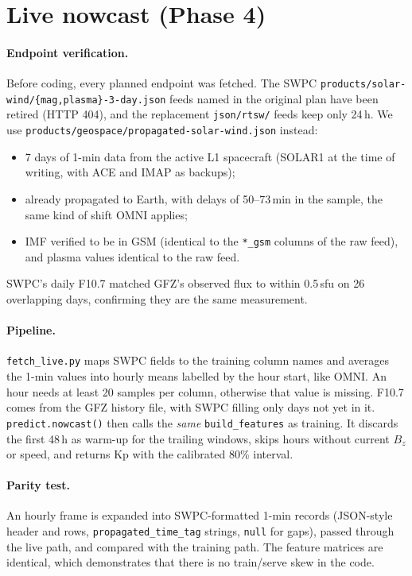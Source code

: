 \documentclass[11pt,a4paper]{article}
\newcommand{\code}[1]{\texttt{#1}}
\begin{document}
\section{Live nowcast (Phase 4)}\label{sec:live}
\paragraph{Endpoint verification.} Before coding, every planned endpoint was fetched. The SWPC
\code{products/solar-wind/\{mag,plasma\}-3-day.json} feeds named in the original plan have been retired (HTTP
404), and the replacement \code{json/rtsw/} feeds keep only 24\,h. We use
\code{products/geospace/propagated-solar-wind.json} instead:
\begin{itemize}
\item 7 days of 1-min data from the active L1 spacecraft (SOLAR1 at the time of writing, with ACE and IMAP as
backups);
\item already propagated to Earth, with delays of 50--73\,min in the sample, the same kind of shift OMNI applies;
\item IMF verified to be in GSM (identical to the \code{*\_gsm} columns of the raw feed), and plasma values
identical to the raw feed.
\end{itemize}
SWPC's daily F10.7 matched GFZ's observed flux to within 0.5\,sfu on 26 overlapping days, confirming they are the
same measurement.

\paragraph{Pipeline.} \code{fetch\_live.py} maps SWPC fields to the training column names and averages the
1-min values into hourly means labelled by the hour start, like OMNI. An hour needs at least 20 samples per
column, otherwise that value is missing. F10.7 comes from the GFZ history file, with SWPC filling only days not yet
in it. \code{predict.nowcast()} then calls the \emph{same} \code{build\_features} as training. It discards the
first 48\,h as warm-up for the trailing windows, skips hours without current $B_z$ or speed, and returns Kp with
the calibrated 80\% interval.

\paragraph{Parity test.} An hourly frame is expanded into SWPC-formatted 1-min records (JSON-style header and rows,
\code{propagated\_time\_tag} strings, \code{null} for gaps), passed through the live path, and compared with the
training path. The feature matrices are identical, which demonstrates that there is no train/serve skew in the
code.
\end{document}
